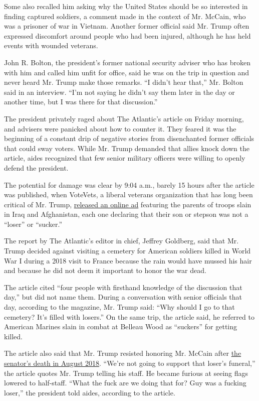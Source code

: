 Some also recalled him asking why the United States should be so
interested in finding captured soldiers, a comment made in the context
of Mr. McCain, who was a prisoner of war in Vietnam. Another former
official said Mr. Trump often expressed discomfort around people who had
been injured, although he has held events with wounded veterans.

John R. Bolton, the president's former national security adviser who has
broken with him and called him unfit for office, said he was on the trip
in question and never heard Mr. Trump make those remarks. ``I didn't
hear that,'' Mr. Bolton said in an interview. ``I'm not saying he didn't
say them later in the day or another time, but I was there for that
discussion.''

The president privately raged about The Atlantic's article on Friday
morning, and advisers were panicked about how to counter it. They feared
it was the beginning of a constant drip of negative stories from
disenchanted former officials that could sway voters. While Mr. Trump
demanded that allies knock down the article, aides recognized that few
senior military officers were willing to openly defend the president.

The potential for damage was clear by 9:04 a.m., barely 15 hours after
the article was published, when VoteVets, a liberal veterans
organization that has long been critical of Mr. Trump,
\href{https://twitter.com/votevets/status/1301868835998400515}{released
an online ad} featuring the parents of troops slain in Iraq and
Afghanistan, each one declaring that their son or stepson was not a
``loser'' or ``sucker.''

The report by The Atlantic's editor in chief, Jeffrey Goldberg, said
that Mr. Trump decided against visiting a cemetery for American soldiers
killed in World War I during a 2018 visit to France because the rain
would have mussed his hair and because he did not deem it important to
honor the war dead.

The article cited ``four people with firsthand knowledge of the
discussion that day,'' but did not name them. During a conversation with
senior officials that day, according to the magazine, Mr. Trump said:
``Why should I go to that cemetery? It's filled with losers.'' On the
same trip, the article said, he referred to American Marines slain in
combat at Belleau Wood as ``suckers'' for getting killed.

The article also said that Mr. Trump resisted honoring Mr. McCain after
\href{https://www.nytimes3xbfgragh.onion/2018/08/25/obituaries/john-mccain-dead.html}{the
senator's death in August 2018}. ``We're not going to support that
loser's funeral,'' the article quotes Mr. Trump telling his staff. He
became furious at seeing flags lowered to half-staff. ``What the fuck
are we doing that for? Guy was a fucking loser,'' the president told
aides, according to the article.

